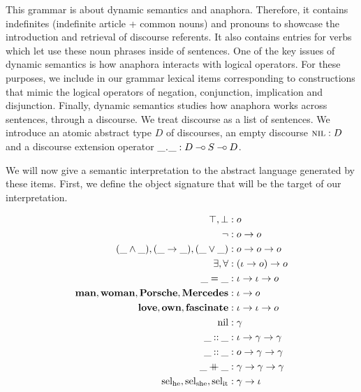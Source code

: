 This grammar is about dynamic semantics and anaphora. Therefore, it
contains indefinites (indefinite article + common nouns) and pronouns to
showcase the introduction and retrieval of discourse referents. It also
contains entries for verbs which let use these noun phrases inside of
sentences. One of the key issues of dynamic semantics is how anaphora
interacts with logical operators. For these purposes, we include in our
grammar lexical items corresponding to constructions that mimic the logical
operators of negation, conjunction, implication and disjunction. Finally,
dynamic semantics studies how anaphora works across sentences, through a
discourse. We treat discourse as a list of sentences. We introduce an
atomic abstract type $D$ of discourses, an empty discourse $\textsc{nil} : D$
and a discourse extension operator $\textsc{\_.\_} : D \mathbin{{-}\mkern-3.5mu{\circ}} S \mathbin{{-}\mkern-3.5mu{\circ}} D$.

We will now give a semantic interpretation to the abstract language
generated by these items. First, we define the object signature that will
be the target of our interpretation.

\begin{align*}
  \top, \bot &: o \\
  \lnot &: o \to o \\
  (\_ \land \_), (\_ \to \_), (\_ \lor \_) &: o \to o \to o \\
  \exists, \forall &: (\iota \to o) \to o \\
  \_ = \_ &: \iota \to \iota \to o \\
  \textbf{man}, \textbf{woman}, \textbf{Porsche}, \textbf{Mercedes} &: \iota \to o \\
  \textbf{love}, \textbf{own}, \textbf{fascinate} &: \iota \to \iota \to o \\
  \mathrm{nil} &: \gamma \\
  \_ \mathbin{::} \_ &: \iota \to \gamma \to \gamma \\
  \_ \mathbin{::} \_ &: o \to \gamma \to \gamma \\
  \_ \mathbin{+\mkern-10mu+} \_ &: \gamma \to \gamma \to \gamma \\
  \operatorname{sel_{he}}, \operatorname{sel_{she}}, \operatorname{sel_{it}} &: \gamma \to \iota
\end{align*}

